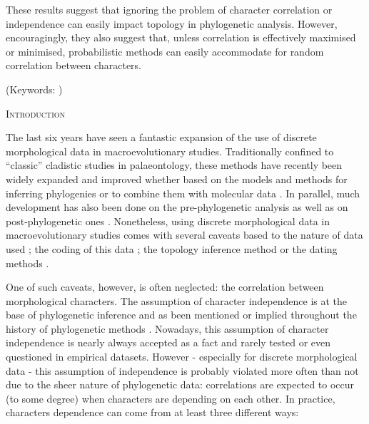 \documentclass[12pt,letterpaper]{article}
\renewcommand{\section}[1]{%
\bigskip
\begin{center}
\begin{Large}
\normalfont\scshape #1
\medskip
\end{Large}
\end{center}}
\begin{document}
These results suggest that ignoring the problem of character correlation or independence can easily impact topology in phylogenetic analysis.
However, encouragingly, they also suggest that, unless correlation is effectively maximised or minimised, probabilistic methods can easily accommodate for random correlation between characters.


\noindent (Keywords: )\\

\vspace{1.5in}

\newpage 

%
%
\section{Introduction}

The last six years have seen a fantastic expansion of the use of discrete morphological data in macroevolutionary studies.
Traditionally confined to ``classic'' cladistic studies in palaeontology, these methods have recently been widely expanded and improved whether based on the models and methods for inferring phylogenies \citep[e.g.][]{heath2014fossilized,Wright01072016} or to combine them with molecular data \citep[e.g.][]{pyrondivergence2011,ronquista2012}.
In parallel, much development has also been done on the pre-phylogenetic analysis \citep[e.g. data collection;][]{morphobank} as well as on post-phylogenetic ones \citep[e.g. morphological disparity analysis;][]{Close2015,Claddis}.
Nonetheless, using discrete morphological data in macroevolutionary studies comes with several caveats based to the nature of data used \citep{Guillerme2016146,bapst2017combined}; the coding of this data \citep{Brazeau2011,simoes2017giant}; the topology inference method \citep{spencerefficacy2013,wrightbayesian2014,OReilly20160081,puttick2017uncertain,goloboff2017weighted} or the dating methods \citep{Arcila2015131,o2016tips}.

One of such caveats, however, is often neglected: the correlation between morphological characters.
The assumption of character independence is at the base of phylogenetic inference and as been mentioned or implied throughout the history of phylogenetic methods \citep[e.g.][]{joysey1982problems,felsenstein1985phylogenies,lewisa2001,felsenstein2004inferring}.
Nowadays, this assumption of character independence is nearly always accepted as a fact and rarely tested or even questioned in empirical datasets.
However - especially for discrete morphological data - this assumption of independence is probably violated more often than not due to the sheer nature of phylogenetic data: correlations are expected to occur (to some degree) when characters are depending on each other.
In practice, characters dependence can come from at least three different ways:
\end{document}

